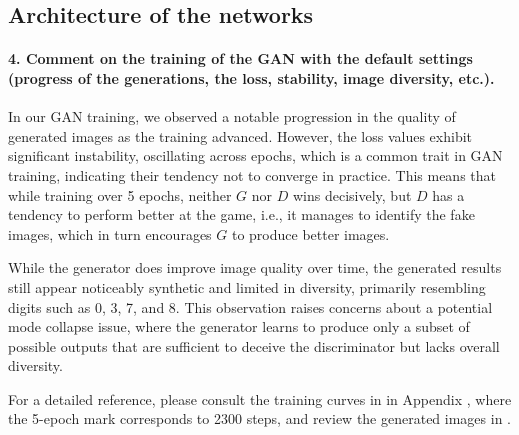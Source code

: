 \subsection{Architecture of the networks}

\paragraph*{4. Comment on the training of the GAN with the default settings (progress of the generations, the loss, stability, image diversity, etc.).}

In our GAN training, we observed a notable progression in the quality of generated images as the training advanced. However, the loss values exhibit significant instability, oscillating across epochs, which is a common trait in GAN training, indicating their tendency not to converge in practice. This means that while training over 5 epochs, neither $G$ nor $D$ wins decisively, but $D$ has a tendency to perform better at the game, i.e., it manages to identify the fake images, which in turn encourages $G$ to produce better images. 

While the generator does improve image quality over time, the generated results still appear noticeably synthetic and limited in diversity, primarily resembling digits such as 0, 3, 7, and 8. This observation raises concerns about a potential mode collapse issue, where the generator learns to produce only a subset of possible outputs that are sufficient to deceive the discriminator but lacks overall diversity.

For a detailed reference, please consult the training curves in  in Appendix , where the 5-epoch mark corresponds to 2300 steps, and review the generated images in .

